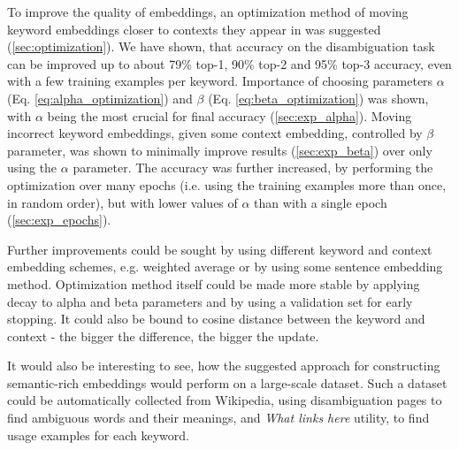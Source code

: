 \documentclass{llncs}
\begin{document}
To improve the quality of embeddings, an optimization method of moving keyword embeddings closer to contexts they appear in was suggested (\ref{sec:optimization}).
We have shown, that accuracy on the disambiguation task can be improved up to about 79\% top-1, 90\% top-2 and 95\% top-3 accuracy, even with a few training examples per keyword.
Importance of choosing parameters \(\alpha\) (Eq. \ref{eq:alpha_optimization}) and \(\beta\) (Eq. \ref{eq:beta_optimization}) was shown, with \(\alpha\) being the most crucial for final accuracy (\ref{sec:exp_alpha}).
Moving incorrect keyword embeddings, given some context embedding, controlled by \(\beta\) parameter, was shown to  minimally improve results (\ref{sec:exp_beta}) over only using the \(\alpha\) parameter.
The accuracy was further increased, by performing the optimization over many epochs (i.e. using the training examples more than once, in random order), but with lower values of \(\alpha\) than with a single epoch (\ref{sec:exp_epochs}).

Further improvements could be sought by using different keyword and context embedding schemes, e.g. weighted average or by using some sentence embedding method. Optimization method itself could be made more stable by applying decay to alpha and beta parameters and by using a validation set for early stopping. It could also be bound to cosine distance between the keyword and context - the bigger the difference, the bigger the update.

It would also be interesting to see, how the suggested approach for constructing semantic-rich embeddings would perform on a large-scale dataset.
Such a dataset could be automatically collected from Wikipedia, using disambiguation pages to find ambiguous words and their meanings, and \textit{What links here} utility, to find usage examples for each keyword.



\end{document}
